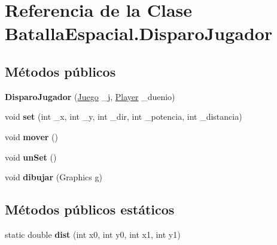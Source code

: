 \hypertarget{classBatallaEspacial_1_1DisparoJugador}{
\section{Referencia de la Clase BatallaEspacial.DisparoJugador}
\label{classBatallaEspacial_1_1DisparoJugador}
}
\subsection*{Métodos públicos}
\begin{DoxyCompactItemize}
\item 
\hypertarget{classBatallaEspacial_1_1DisparoJugador_aa61493d90cfc993d0e920f0b79ec19b6}{
{\bfseries DisparoJugador} (\hyperlink{classBatallaEspacial_1_1Juego}{Juego} \_\-j, \hyperlink{classBatallaEspacial_1_1Player}{Player} \_\-duenio)}
\label{classBatallaEspacial_1_1DisparoJugador_aa61493d90cfc993d0e920f0b79ec19b6}

\item 
\hypertarget{classBatallaEspacial_1_1DisparoJugador_aab5a643b072987cf2d4f1a5d9dcff73b}{
void {\bfseries set} (int \_\-x, int \_\-y, int \_\-dir, int \_\-potencia, int \_\-distancia)}
\label{classBatallaEspacial_1_1DisparoJugador_aab5a643b072987cf2d4f1a5d9dcff73b}

\item 
\hypertarget{classBatallaEspacial_1_1DisparoJugador_a6e5645b615991b96ee61e8d1c5a4a8cd}{
void {\bfseries mover} ()}
\label{classBatallaEspacial_1_1DisparoJugador_a6e5645b615991b96ee61e8d1c5a4a8cd}

\item 
\hypertarget{classBatallaEspacial_1_1DisparoJugador_ab46d7377b7072574918df5222076e141}{
void {\bfseries unSet} ()}
\label{classBatallaEspacial_1_1DisparoJugador_ab46d7377b7072574918df5222076e141}

\item 
\hypertarget{classBatallaEspacial_1_1DisparoJugador_ae9a04a384a342c98d696f893eabb9cda}{
void {\bfseries dibujar} (Graphics g)}
\label{classBatallaEspacial_1_1DisparoJugador_ae9a04a384a342c98d696f893eabb9cda}

\end{DoxyCompactItemize}
\subsection*{Métodos públicos estáticos}
\begin{DoxyCompactItemize}
\item 
\hypertarget{classBatallaEspacial_1_1DisparoJugador_a12cb891b8f12d8ab631c7ab0d98002db}{
static double {\bfseries dist} (int x0, int y0, int x1, int y1)}
\label{classBatallaEspacial_1_1DisparoJugador_a12cb891b8f12d8ab631c7ab0d98002db}

\end{DoxyCompactItemize}
